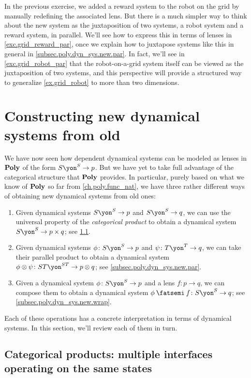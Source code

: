 \documentclass[Book-Poly]{subfiles}
\begin{document}
In the previous exercise, we added a reward system to the robot on the grid by manually redefining the associated lens.
But there is a much simpler way to think about the new system as the juxtaposition of two systems, a robot system and a reward system, in parallel.
We'll see how to express this in terms of lenses in \cref{exc.grid_reward_par}, once we explain how to juxtapose systems like this in general in \cref{subsec.poly.dyn_sys.new.par}.
In fact, we'll see in \cref{exc.grid_robot_par} that the robot-on-a-grid system itself can be viewed as the juxtaposition of two systems, and this perspective will provide a structured way to generalize \cref{ex.grid_robot} to more than two dimensions.


\section{Constructing new dynamical systems from old}\label{sec.poly.dyn_sys.new}

We have now seen how dependent dynamical systems can be modeled as lenses in $\mathbf{Poly}$ of the form $S\yon^S\to p$.
But we have yet to take full advantage of the categorical structure that $\mathbf{Poly}$ provides.
In particular, purely based on what we know of $\mathbf{Poly}$ so far from \cref{ch.poly.func_nat}, we have three rather different ways of obtaining new dynamical systems from old ones:
\begin{enumerate}
    \item Given dynamical systems $S\yon^S\to p$ and $S\yon^S\to q$, we can use the universal property of the \emph{categorical product} to obtain a dynamical system $S\yon^S\to p\times q$; see \cref{subsec.poly.dyn_sys.new.prod}.
    \item Given dynamical systems $\phi\colon S\yon^S\to p$ and $\psi\colon T\yon^T\to q$, we can take their parallel product to obtain a dynamical system $\phi\otimes\psi\colon ST\yon^{ST}\to p\otimes q$; see \cref{subsec.poly.dyn_sys.new.par}.
    \item Given a dynamical system $\phi\colon S\yon^S\to p$ and a lens $f\colon p\to q$, we can compose them to obtain a dynamical system $\phi\then f\colon S\yon^S\to q$; see \cref{subsec.poly.dyn_sys.new.wrap}.
\end{enumerate}
Each of these operations has a concrete interpretation in terms of dynamical systems.
In this section, we'll review each of them in turn.

\subsection{Categorical products: multiple interfaces operating on the same states}\label{subsec.poly.dyn_sys.new.prod}
\end{document}
